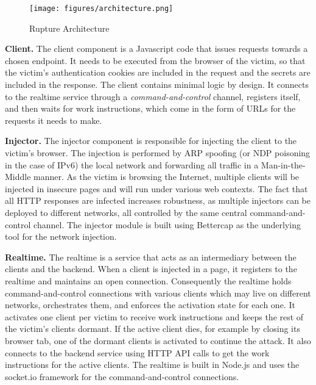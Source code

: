    \begin{figure}[thpb]
      \centering
          \texttt{[image: figures/architecture.png]}
      \caption{Rupture Architecture}
        \label{fig:rupture_architecture}
   \end{figure}

\noindent \textbf{Client.}
The client component is a Javascript code that issues requests towards a chosen
endpoint. It needs to be executed from the browser of the victim, so that the
victim's authentication cookies are included in the request and the secrets are
included in the response. The client contains minimal logic by design. It
connects to the realtime service through a \textit{command-and-control} channel,
registers itself, and then waits for work instructions, which come in the form
of URLs for the requests it needs to make.

\noindent \textbf{Injector.}
The injector component is responsible for injecting the client to the victim's
browser. The injection is performed by ARP spoofing (or NDP poisoning in the
case of IPv6) the local network and forwarding all traffic in a
Man-in-the-Middle manner. As the victim is browsing the Internet, multiple
clients will be injected in insecure pages and will run under various web contexts.
The fact that all HTTP responses are infected increases robustness,
as multiple injectors can be deployed to different networks, all controlled by the
same central command-and-control channel. The injector module is built using
Bettercap as the underlying tool for the network injection.

\noindent \textbf{Realtime.}
The realtime is a service that acts as an intermediary between the clients and
the backend. When a client is injected in a page, it registers to the realtime and
maintains an open connection. Consequently the realtime holds command-and-control
connections with various clients which may live on different networks,
orchestrates them, and enforces the activation state for each one. It
activates one client per victim to receive work instructions and keeps the rest of
the victim's clients dormant. If the active client dies, for example by closing
its browser tab, one of the dormant clients is activated to continue the
attack. It also connects to the backend service using HTTP API calls to get
the work instructions for the active clients. The realtime is built in
Node.js \cite{tilkov2010node} and uses the socket.io framework
\cite{rai2013socket} for the command-and-control connections.

